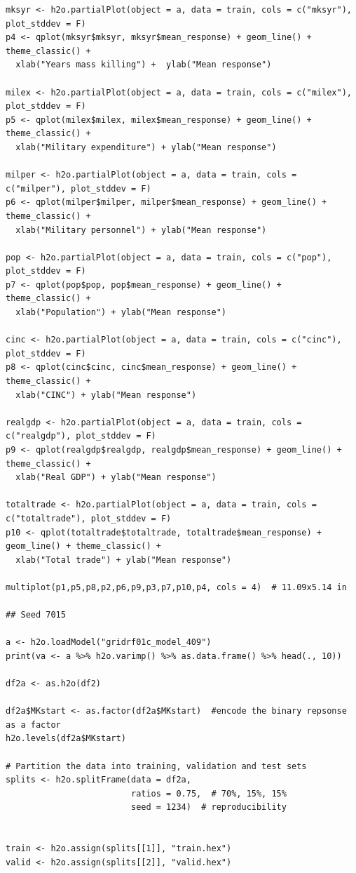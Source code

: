 \documentclass[a4paper,12pt]{article}
\begin{document}
\begin{verbatim}
mksyr <- h2o.partialPlot(object = a, data = train, cols = c("mksyr"), plot_stddev = F)
p4 <- qplot(mksyr$mksyr, mksyr$mean_response) + geom_line() + theme_classic() +
  xlab("Years mass killing") +  ylab("Mean response")

milex <- h2o.partialPlot(object = a, data = train, cols = c("milex"), plot_stddev = F)
p5 <- qplot(milex$milex, milex$mean_response) + geom_line() + theme_classic() +
  xlab("Military expenditure") + ylab("Mean response")

milper <- h2o.partialPlot(object = a, data = train, cols = c("milper"), plot_stddev = F)
p6 <- qplot(milper$milper, milper$mean_response) + geom_line() + theme_classic() +
  xlab("Military personnel") + ylab("Mean response")

pop <- h2o.partialPlot(object = a, data = train, cols = c("pop"), plot_stddev = F)
p7 <- qplot(pop$pop, pop$mean_response) + geom_line() + theme_classic() +
  xlab("Population") + ylab("Mean response")

cinc <- h2o.partialPlot(object = a, data = train, cols = c("cinc"), plot_stddev = F)
p8 <- qplot(cinc$cinc, cinc$mean_response) + geom_line() + theme_classic() +
  xlab("CINC") + ylab("Mean response")

realgdp <- h2o.partialPlot(object = a, data = train, cols = c("realgdp"), plot_stddev = F)
p9 <- qplot(realgdp$realgdp, realgdp$mean_response) + geom_line() + theme_classic() +
  xlab("Real GDP") + ylab("Mean response")

totaltrade <- h2o.partialPlot(object = a, data = train, cols = c("totaltrade"), plot_stddev = F)
p10 <- qplot(totaltrade$totaltrade, totaltrade$mean_response) + geom_line() + theme_classic() +
  xlab("Total trade") + ylab("Mean response")

multiplot(p1,p5,p8,p2,p6,p9,p3,p7,p10,p4, cols = 4)  # 11.09x5.14 in

## Seed 7015

a <- h2o.loadModel("gridrf01c_model_409")
print(va <- a %>% h2o.varimp() %>% as.data.frame() %>% head(., 10))

df2a <- as.h2o(df2)

df2a$MKstart <- as.factor(df2a$MKstart)  #encode the binary repsonse as a factor
h2o.levels(df2a$MKstart)

# Partition the data into training, validation and test sets
splits <- h2o.splitFrame(data = df2a, 
                         ratios = 0.75,  # 70%, 15%, 15%
                         seed = 1234)  # reproducibility


train <- h2o.assign(splits[[1]], "train.hex")   
valid <- h2o.assign(splits[[2]], "valid.hex") 


\end{verbatim}
\end{document}
